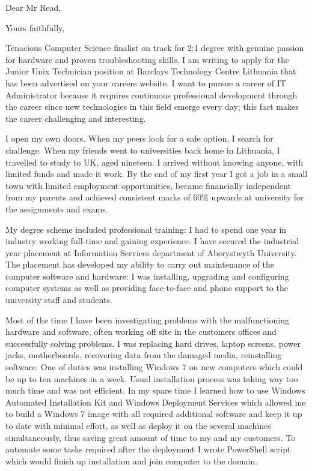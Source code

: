 \documentclass[11pt,a4paper,sans]{moderncv}        %
\begin{document}
\date{\today}
\opening{Dear Mr Read,}
\closing{Yours faithfully,}
\makelettertitle

Tenacious Computer Science finalist on track for 2:1 degree with genuine passion for hardware and proven troubleshooting skills, I am writing to apply for the Junior Unix Technician position at Barclays Technology Centre Lithuania that has been advertised on your careers website. I want to pursue a career of IT Administrator because it requires continuous professional development through the career since new technologies in this field emerge every day; this fact makes the career challenging and interesting.

I open my own doors. When my peers look for a safe option, I search for challenge. When my friends went to universities back home in Lithuania, I travelled to study to UK, aged nineteen. I arrived without knowing anyone, with limited funds and made it work. By the end of my first year I got a job in a small town with limited employment opportunities, became financially independent from my parents and achieved consistent marks of 60\% upwards at university for the assignments and exams.

My degree scheme included professional training: I had to spend one year in industry working full-time and gaining experience.  I have secured the industrial year placement at Information Services department of Aberystwyth University. The placement has developed my ability to carry out maintenance of the computer software and hardware: I was installing, upgrading and configuring computer systems as well as providing face-to-face and phone support to the university staff and students. 

Most of the time I have been investigating problems with the malfunctioning hardware and software, often working off site in the customers offices and successfully solving problems. I was replacing hard drives, laptop screens, power jacks, motherboards, recovering data from the damaged media, reinstalling software. One of duties was installing Windows 7 on new computers which could be up to ten machines in a week. Usual installation process was taking way too much time and was not efficient. In my spare time I learned how to use Windows Automated Installation Kit and Windows Deployment Services which allowed me to build a Windows 7 image with all required additional software and keep it up to date with minimal effort, as well as deploy it on the several machines simultaneously, thus saving great amount of time to my and my customers. To automate some tasks required after the deployment I wrote PowerShell script which would finish up installation and join computer to the domain. 
\end{document}
